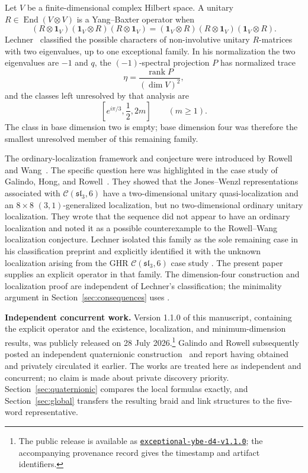 \documentclass[11pt]{article}
\theoremstyle{remark}
\newcommand{\Id}{\mathbf 1}
\newcommand{\End}{\operatorname{End}}
\newcommand{\rank}{\operatorname{rank}}
\newcommand{\cC}{\mathcal C}
\begin{document}
Let \(V\) be a finite-dimensional complex Hilbert space.  A unitary
\(R\in\End(V\otimes V)\) is a Yang--Baxter operator when
\begin{equation}
  (R\otimes\Id_V)(\Id_V\otimes R)(R\otimes\Id_V)
  =
  (\Id_V\otimes R)(R\otimes\Id_V)(\Id_V\otimes R).
  \label{eq:ybe}
\end{equation}
Lechner~\cite{Lechner2026} classified the possible characters of
non-involutive unitary \(R\)-matrices with two eigenvalues, up to one
exceptional family.  In his normalization the two eigenvalues are
\(-1\) and \(q\), the \((-1)\)-spectral projection \(P\) has normalized
trace
\[
  \eta=\frac{\rank P}{(\dim V)^2},
\]
and the classes left unresolved by that analysis are
\[
  \left[e^{i\pi/3},\frac12,2m\right]\qquad(m\ge1).
\]
The class in base dimension two is empty; base dimension four was therefore
the smallest unresolved member of this remaining family.

The ordinary-localization framework and conjecture were introduced by Rowell
and Wang~\cite{RowellWang2012}.  The specific question here was highlighted
in the case study of Galindo, Hong, and Rowell~\cite[\S5.6]{GHR2013}.  They
showed that the Jones--Wenzl
representations associated with \(\cC(\mathfrak{sl}_3,6)\) have a
two-dimensional unitary quasi-localization and an \(8\times8\)
\((3,1)\)-generalized localization,
but no two-dimensional ordinary unitary localization.  They wrote that the
sequence did not appear to have an ordinary localization and noted it as a
possible counterexample to the Rowell--Wang localization conjecture.  Lechner isolated
this family as the sole remaining case in his classification preprint and
explicitly identified it with the unknown localization arising from the GHR
\(\cC(\mathfrak{sl}_3,6)\) case study
\cite[p.~16, discussion following Proposition~3.6]{Lechner2026}.  The present
paper supplies an explicit operator in that family.  The dimension-four
construction and localization proof are independent of Lechner's
classification; the minimality argument in Section~\ref{sec:consequences}
uses \cite[Lemma~3.1 and Theorem~3.4]{Lechner2026}.

\medskip
\noindent\textbf{Independent concurrent work.}
Version 1.1.0 of this manuscript, containing the explicit operator and the
existence, localization, and minimum-dimension results, was publicly released
on 28 July 2026.\footnote{The public release is available as
\href{https://github.com/AlecKriebel/Math/releases/tag/exceptional-ybe-d4-v1.1.0}
{\texttt{exceptional-ybe-d4-v1.1.0}}; the accompanying provenance record
gives the timestamp and artifact identifiers.}
Galindo and Rowell subsequently posted an independent quaternionic
construction~\cite{GalindoRowell2026} and report having obtained and privately
circulated it earlier.  The works are treated here as independent and
concurrent; no claim is made about private discovery priority.
Section~\ref{sec:quaternionic} compares the local formulas exactly, and
Section~\ref{sec:global} transfers the resulting braid and link structures to
the five-word representative.
\end{document}
